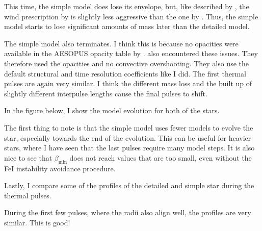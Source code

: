 \documentclass[a4paper,10pt]{article}
\begin{document}
This time, the simple model does lose its envelope, but, like described by \citet{rees2024b}, the wind prescription by \citet{vassiliadis1993} is slightly less aggressive than the one by \citet{trabucchi2018}.
Thus, the simple model starts to lose significant amounts of mass later than the detailed model.

The simple model also terminates. I think this is because no opacities were available in the AESOPUS opacity table by \citet{marigo2009}.
\citet{joyce2024} also encountered these issues.
They therefore used the \citet{ferguson1905} opacities and no convective overshooting.
They also use the default structural and time resolution coefficients like I did. 
The first thermal pulses are again very similar. I think the different mass loss and the built up of slightly different interpulse lengths cause the final pulses to shift.

In the figure below, I show the model evolution for both of the stars.

\begin{figure}[ht]
    \centering
\end{figure}

The first thing to note is that the simple model uses fewer models to evolve the star, especially towards the end of the evolution.
This can be useful for heavier stars, where I have seen that the last pulses require many model steps. 
It is also nice to see that \(\beta _\text{min}\) does not reach values that are too small, even without the FeI instability avoidance procedure.

Lastly, I compare some of the profiles of the detailed and simple star during the thermal pulses.

\begin{figure}[ht]
    \centering
\end{figure}

During the first few pulses, where the radii also align well, the profiles are very similar. This is good!

\newpage

\end{document}
